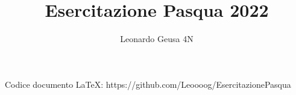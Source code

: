 \documentclass[12pt]{article}
\begin{document}
\title{Esercitazione Pasqua 2022}
\date{}
\author{Leonardo Geusa 4N}
\setcounter{section}{-1}
\maketitle


\newpage
\vspace*{3cm}
\tableofcontents



\raggedright

























Codice documento LaTeX: https://github.com/Leoooog/EsercitazionePasqua
\end{document}
